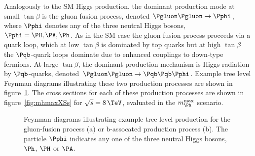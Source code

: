 Analogously to the \ac{SM} Higgs production, the dominant production mode at
small $\tan\beta$ is the gluon fusion process, denoted
$\Pgluon\Pgluon\to\Pphi$, where $\Pphi$ denotes any of the three neutral Higgs
bosons, $\Pphi=\PH,\PA,\Ph$. As in the \ac{SM} case the gluon fusion process
proceeds via a quark loop, which at low $\tan\beta$ is dominated by top quarks
but at high $\tan\beta$ the $\Pqb$-quark loops dominate due to enhanced couplings to
down-type fermions. At large $\tan\beta$, the dominant production mechanism is
Higgs radiation by $\Pqb$-quarks, denoted $\Pgluon\Pgluon\to\Pqb\Pqb\Pphi$.
Example tree level Feynman diagrams illustrating these two production processes
are shown in figure~\ref{fig:mssmfeynman}. The cross sections for each of these 
production processes are shown in
figure~\ref{fig:mhmaxXSs} for $\sqrt{s}=8\,\TeV$, evaluated in the $m_{\Ph}^{\text{max}}$
scenario.

\begin{figure}[htbp]
\caption[Feynman diagrams illustrating example tree level production of neutral
Higgs bosons in the MSSM.]{Feynman diagrams illustrating example tree level production for the
gluon-fusion process (a) or b-assocated production process (b). The
particle $\Pphi$ indicates any one of the three neutral Higgs bosons, $\Ph$,
$\PH$ or $\PA$.}
\label{fig:mssmfeynman}
\end{figure}

